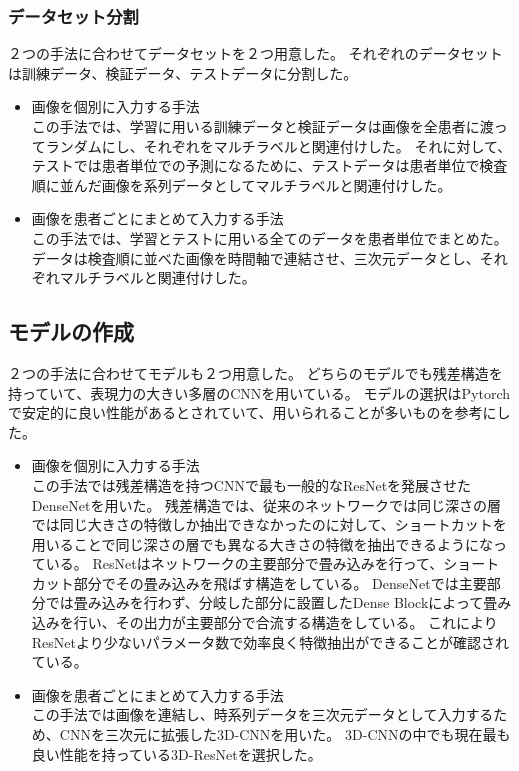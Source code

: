 \subsubsection{データセット分割}
２つの手法に合わせてデータセットを２つ用意した。
それぞれのデータセットは訓練データ、検証データ、テストデータに分割した。
\begin{itemize}
    \item 画像を個別に入力する手法\\
この手法では、学習に用いる訓練データと検証データは画像を全患者に渡ってランダムにし、それぞれをマルチラベルと関連付けした。
それに対して、テストでは患者単位での予測になるために、テストデータは患者単位で検査順に並んだ画像を系列データとしてマルチラベルと関連付けした。
    \item 画像を患者ごとにまとめて入力する手法\\
この手法では、学習とテストに用いる全てのデータを患者単位でまとめた。
データは検査順に並べた画像を時間軸で連結させ、三次元データとし、それぞれマルチラベルと関連付けした。
\end{itemize}

\subsection{モデルの作成}
２つの手法に合わせてモデルも２つ用意した。
どちらのモデルでも残差構造を持っていて、表現力の大きい多層のCNNを用いている。
モデルの選択はPytorchで安定的に良い性能があるとされていて、用いられることが多いものを参考にした。
\begin{itemize}
    \item 画像を個別に入力する手法\\
この手法では残差構造を持つCNN\cite{CNN}で最も一般的なResNet\cite{ResNet}を発展させたDenseNet\cite{DenseNet}を用いた。
残差構造では、従来のネットワークでは同じ深さの層では同じ大きさの特徴しか抽出できなかったのに対して、ショートカットを用いることで同じ深さの層でも異なる大きさの特徴を抽出できるようになっている。
ResNet\cite{ResNet}はネットワークの主要部分で畳み込みを行って、ショートカット部分でその畳み込みを飛ばす構造をしている。
DenseNet\cite{DenseNet}では主要部分では畳み込みを行わず、分岐した部分に設置したDense Blockによって畳み込みを行い、その出力が主要部分で合流する構造をしている。
これによりResNet\cite{ResNet}より少ないパラメータ数で効率良く特徴抽出ができることが確認されている。
    \item 画像を患者ごとにまとめて入力する手法\\
この手法では画像を連結し、時系列データを三次元データとして入力するため、CNNを三次元に拡張した3D-CNNを用いた。
3D-CNNの中でも現在最も良い性能を持っている3D-ResNet\cite{3D_ResNet}を選択した。
\end{itemize}

